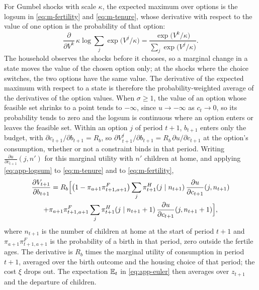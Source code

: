 For Gumbel shocks with scale $\kappa$, the expected maximum over options is
the logsum in \eqref{eq:m-fertility} and \eqref{eq:m-tenure}, whose
derivative with respect to the value of one option is the probability of
that option:
\begin{equation}
 \frac{\partial}{\partial V^k}\,\kappa\log\sum_{j}\exp\bigl(V^j/\kappa\bigr)
 =\frac{\exp\bigl(V^k/\kappa\bigr)}{\sum_{j}\exp\bigl(V^j/\kappa\bigr)} .
 \label{eq:app-logsum}
\end{equation}
The household observes the shocks before it chooses, so a marginal change in
a state moves the value of the chosen option only; at the shocks where the
choice switches, the two options have the same value. The derivative of the
expected maximum with respect to a state is therefore the
probability-weighted average of the derivatives of the option values. When
$\sigma\ge1$, the value of an option whose feasible set shrinks to a point
tends to $-\infty$, since $u\to-\infty$ as $c_t\to0$, so its probability
tends to zero and the logsum is continuous where an option enters or leaves
the feasible set. Within an option $j$ of period $t+1$, $b_{t+1}$ enters
only the budget, with $\partial c_{t+1}/\partial b_{t+1}=R_b$, so
$\partial V^j_{t+1}/\partial b_{t+1}=R_b\,\partial u/\partial c_{t+1}$ at the
option's consumption, whether or not a constraint binds in that period.
Writing $\frac{\partial u}{\partial c_{t+1}}(j,n')$ for this marginal
utility with $n'$ children at home, and applying \eqref{eq:app-logsum} to
\eqref{eq:m-tenure} and to \eqref{eq:m-fertility},
\begin{multline}
 \frac{\partial V_{t+1}}{\partial b_{t+1}}
 =R_b\Bigl[\bigl(1-\pi_{a+1}\pi^F_{t+1,a+1}\bigr)\sum_{j}\pi^H_{t+1}(j\mid n_{t+1})\,\frac{\partial u}{\partial c_{t+1}}(j,n_{t+1})\\
 +\pi_{a+1}\pi^F_{t+1,a+1}\sum_{j}\pi^H_{t+1}(j\mid n_{t+1}+1)\,\frac{\partial u}{\partial c_{t+1}}(j,n_{t+1}+1)\Bigr],
 \label{eq:app-envelope}
\end{multline}
where $n_{t+1}$ is the number of children at home at the start of period
$t+1$ and $\pi_{a+1}\pi^F_{t+1,a+1}$ is the probability of a birth in that
period, zero outside the fertile ages. The derivative is $R_b$ times the
marginal utility of consumption in period $t+1$, averaged over the birth
outcome and the housing choice of that period; the cost $\xi$ drops out. The
expectation $\mathbb E_t$ in \eqref{eq:app-euler} then averages over $z_{t+1}$ and
the departure of children.

